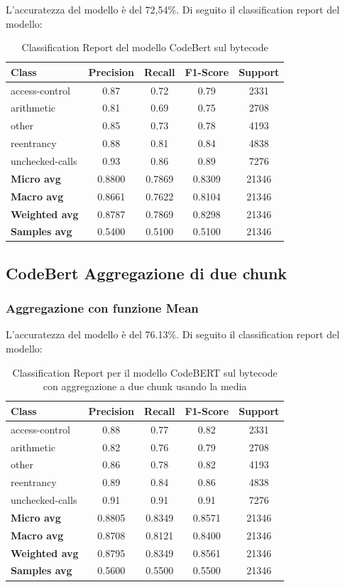 \documentclass[../../Thesis.tex]{subfiles}
\begin{document}
L'accuratezza del modello è del 72,54\%. Di seguito il classification report del modello: 
\begin{table}[H]
\centering
\small
\begin{tabular}{lcccc}
\hline
\textbf{Class} & \textbf{Precision} & \textbf{Recall} & \textbf{F1-Score} & \textbf{Support} \\
\hline
access-control & 0.87 & 0.72 & 0.79 & 2331 \\
arithmetic & 0.81 & 0.69 & 0.75 & 2708 \\
other & 0.85 & 0.73 & 0.78 & 4193 \\
reentrancy & 0.88 & 0.81 & 0.84 & 4838 \\
unchecked-calls & 0.93 & 0.86 & 0.89 & 7276 \\
\hline
\textbf{Micro avg} & 0.8800 & 0.7869 & 0.8309 & 21346 \\
\textbf{Macro avg} & 0.8661 & 0.7622 & 0.8104 & 21346 \\
\textbf{Weighted avg} & 0.8787 & 0.7869 & 0.8298 & 21346 \\
\textbf{Samples avg} & 0.5400 & 0.5100 & 0.5100 & 21346 \\
\hline
\end{tabular}
\caption{Classification Report del modello CodeBert sul bytecode}
\end{table}

\subsection{CodeBert Aggregazione di due chunk}
\subsubsection{Aggregazione con funzione Mean}
L'accuratezza del modello è del 76.13\%. Di seguito il classification report del modello:
\begin{table}[H]
    \centering
    \small
    \begin{tabular}{lcccc}
    \hline
    \textbf{Class} & \textbf{Precision} & \textbf{Recall} & \textbf{F1-Score} & \textbf{Support} \\
    \hline
    access-control & 0.88 & 0.77 & 0.82 & 2331 \\
    arithmetic & 0.82 & 0.76 & 0.79 & 2708 \\
    other & 0.86 & 0.78 & 0.82 & 4193 \\
    reentrancy & 0.89 & 0.84 & 0.86 & 4838 \\
    unchecked-calls & 0.91 & 0.91 & 0.91 & 7276 \\
    \hline
    \textbf{Micro avg} & 0.8805 & 0.8349 & 0.8571 & 21346 \\
    \textbf{Macro avg} & 0.8708 & 0.8121 & 0.8400 & 21346 \\
    \textbf{Weighted avg} & 0.8795 & 0.8349 & 0.8561 & 21346 \\
    \textbf{Samples avg} & 0.5600 & 0.5500 & 0.5500 & 21346 \\
    \hline
    \end{tabular}
    \caption{Classification Report per il modello CodeBERT sul bytecode con aggregazione a due chunk usando la media}
    \end{table}
    
\end{document}
